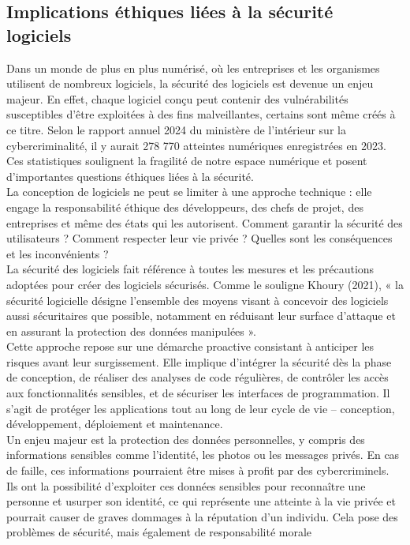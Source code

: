 \documentclass{article}
\begin{document}
\subsection{Implications éthiques liées à la sécurité  logiciels}
Dans un monde de plus en plus numérisé, où les entreprises et les organismes utilisent de
nombreux logiciels, la sécurité des logiciels est devenue un enjeu majeur. En effet, chaque
logiciel conçu peut contenir des vulnérabilités susceptibles d’être exploitées à des fins
malveillantes, certains sont même créés à ce titre. Selon le rapport annuel 2024 du ministère de
l’intérieur sur la cybercriminalité, il y aurait
278 770 atteintes numériques enregistrées en
2023. Ces statistiques soulignent la fragilité de notre espace numérique et posent
d'importantes questions éthiques liées à la sécurité.\\

La conception de logiciels ne peut se limiter à une approche technique : elle engage la
responsabilité éthique des développeurs, des chefs de projet, des entreprises et même des
états qui les autorisent. Comment garantir la sécurité des utilisateurs ? Comment respecter leur
vie privée ? Quelles sont les conséquences et les inconvénients ?\\

La sécurité des logiciels fait référence à toutes les mesures et les précautions adoptées pour
créer des logiciels sécurisés. Comme le souligne Khoury (2021),
« la sécurité logicielle désigne
l’ensemble des moyens visant à concevoir des logiciels aussi sécuritaires que possible,
notamment en réduisant leur surface d’attaque et en assurant la protection des données
manipulées ».\\

Cette approche repose sur une démarche proactive consistant à anticiper les risques avant leur
surgissement. Elle implique d'intégrer la sécurité dès la phase de conception, de réaliser des
analyses de code régulières, de contrôler les accès aux fonctionnalités sensibles, et de sécuriser
les interfaces de programmation. Il s’agit de protéger les applications tout au long de leur cycle
de vie – conception, développement, déploiement et maintenance.\\

Un enjeu majeur est la protection des données personnelles, y compris des informations
sensibles comme l’identité, les photos ou les messages privés. En cas de faille, ces informations
pourraient être mises à profit par des cybercriminels. Ils ont la possibilité d'exploiter ces
données sensibles pour reconnaître une personne et usurper son identité, ce qui représente une
atteinte à la vie privée et pourrait causer de graves dommages à la réputation d'un individu.
Cela pose des problèmes de sécurité, mais également de responsabilité morale\\
\end{document}
